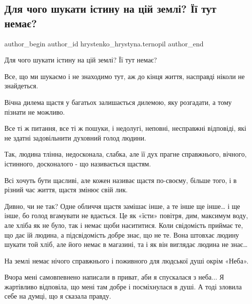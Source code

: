  
 
 
 
 
 
\subsection{Для чого шукати істину на цій землі? Її тут немає?}
\label{sec:07_12_2022.fb.hrystenko_hrystyna.ternopil.1.istyna}
 
\ifcmt
 author_begin
   author_id hrystenko_hrystyna.ternopil
 author_end
\fi

Для чого шукати істину на цій землі? Її тут немає?

Все, що ми шукаємо і не знаходимо тут, аж до кінця життя, насправді ніколи не
знайдеться. 

Вічна дилема щастя у багатьох залишається дилемою, яку розгадати, а тому
пізнати не можливо. 

Все ті ж питання, все ті ж пошуки, і недолугі, неповні, несправжні відповіді,
які не здатні задовільнити духовний голод людини. 

Так, людина тлінна, недосконала, слабка, але її дух прагне справжнього,
вічного, істинного, досконалого - що називається щастям. 

Всі хочуть бути щасливі, але кожен називає щастя по-своєму, більше того, і в
різний час життя, щастя змінює свій лик. 

Дивно, чи не так? Одне обличчя щастя замішає інше, а те інше ще інше… і ще
інше, бо голод вгамувати не вдається. Це як «їсти» повітря, дим, максимум воду,
але хліба як не було, так і немає щоби насититися. Коли свідомість приймає те,
що дає їй людина, а підсвідомість добре знає, що не те. Вона штовхає людину
шукати той хліб, але його немає в магазині, та і як він виглядає людина не
знає… 

На землі немає нічого справжнього і поживного для людської душі окрім «Неба». 

Вчора мені самовпевнено написали в приват, аби я спускалася з неба... Я
жартівливо відповіла, що мені там добре і посміхнулася в душі. А тоді зловила
себе на думці, що я сказала правду. 

